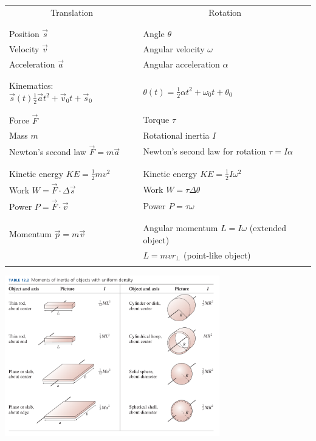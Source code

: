 \documentclass{article}
\begin{document}
\begin{center}
\begin{tabular}{l | l}

 \multicolumn{1}{c|}{\Large Translation} & \multicolumn{1}{c}{\Large Rotation} \\
 \\
\hline
\hline
 & \\
Position $\vec s$ & Angle $\theta$ \\
Velocity $\vec v$ & Angular velocity $\omega$ \\
Acceleration $\vec a$ & Angular acceleration $\alpha$ \\
 & \\
\hline
\hline
 & \\
Kinematics: $\vec s(t)\frac{1}{2}\vec at^2 + \vec v_0 t + \vec s_0$ & $\theta(t) = \frac{1}{2}\alpha t^2 + \omega_0 t + \theta_0$ \\
 & \\
\hline
\hline

 & \\
Force $\vec F$ & Torque $\tau$ \\
Mass $m$ & Rotational inertia $I$ \\
Newton's second law $\vec F = m \vec a$ & Newton's second law for rotation $\tau = I \alpha$ \\
 & \\

\hline
\hline

 & \\
Kinetic energy $KE=\frac{1}{2}mv^2$ & Kinetic energy $KE=\frac{1}{2}I\omega^2$ \\
Work $W = \vec F \cdot \Delta \vec s$ & Work $W = \tau \Delta \theta$ \\
Power $P = \vec F \cdot \vec v$ & Power $P = \tau \omega$ \\
 & \\

\hline
\hline

 & \\
Momentum $\vec p = m \vec v$ & Angular momentum $L = I\omega$ (extended object)\\
& \hspace{8.7em} $L = mvr_\perp$ (point-like object) \\
 & \\

\hline
\end{tabular}

\bigskip

\includegraphics[width=0.7\textwidth]{moment-table.png}

\end{center}
\end{document}

